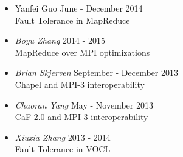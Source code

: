 \begin{itemize}
    \item {Yanfei Guo} \hfill June - December 2014 \\
        Fault Tolerance in MapReduce \\
    \item{\sl Boyu Zhang} \hfill 2014 - 2015 \\
        MapReduce over MPI optimizations \\
    \item{\sl Brian Skjerven} \hfill September - December 2013 \\
        Chapel and MPI-3 interoperability \\
    \item{\sl Chaoran Yang} \hfill May - November 2013 \\
        CaF-2.0 and MPI-3 interoperability \\
    \item{\sl Xiuxia Zhang} \hfill 2013 - 2014 \\
        Fault Tolerance in VOCL \\
\end{itemize}
